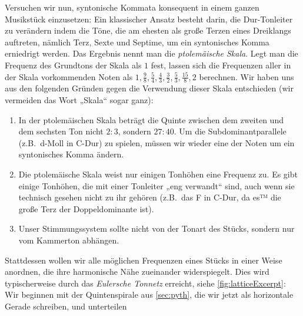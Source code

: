 \documentclass[ngerman,11pt]{scrartcl}
\begin{document}
Versuchen wir nun, syntonische Kommata konsequent in einem ganzen Musikstück
einzusetzen: Ein klassischer Ansatz besteht darin, die Dur-Tonleiter zu
verändern indem die Töne, die am ehesten als große Terzen eines Dreiklangs
auftreten, nämlich Terz, Sexte und Septime, um ein syntonisches Komma erniedrigt
werden. Das Ergebnis nennt man die \emph{ptolemäische Skala}. Legt man die
Frequenz des Grundtons der Skala als $1$ fest, lassen sich die Frequenzen aller
in der Skala vorkommenden Noten als 
$1,\frac98,\frac54,\frac43,\frac32,\frac53,\frac{15}8,2$ berechnen. Wir haben
uns aus den folgenden Gründen gegen die Verwendung dieser Skala entschieden
(wir vermeiden das Wort „Skala“ sogar ganz):
\begin{enumerate}
\item In der ptolemäischen Skala beträgt die Quinte zwischen dem zweiten und dem
  sechsten Ton nicht $2:3$, sondern $27:40$. Um die Subdominantparallele
  (z.B.\ d-Moll in C-Dur) zu spielen, müssen wir wieder eine der Noten um ein
  syntonisches Komma ändern.
\item Die ptolemäische Skala weist nur einigen Tonhöhen eine Frequenz zu. Es 
  gibt einige Tonhöhen, die mit einer Tonleiter „eng verwandt“ sind, auch wenn
  sie technisch gesehen nicht zu ihr gehören (z.B.\ das \sharp F in C-Dur, da
  es™ die große Terz der Doppeldominante ist).
\item Unser Stimmungssystem sollte nicht von der Tonart des Stücks, sondern nur
  vom Kammerton abhängen.
\end{enumerate}
Stattdessen wollen wir alle möglichen Frequenzen eines Stücks in einer Weise
anordnen, die ihre harmonische Nähe zueinander widerspiegelt. Dies wird
typischerweise durch das \emph{Eulersche Tonnetz} erreicht, siehe
\cref{fig:latticeExcerpt}: Wir beginnen mit der Quintenspirale aus
\cref{sec:pyth}, die wir jetzt als horizontale Gerade schreiben, und unterteilen
\end{document}
